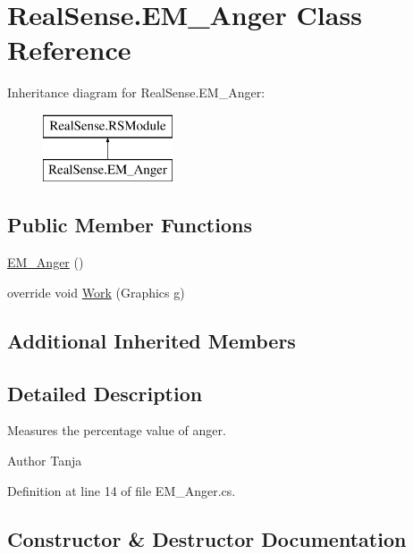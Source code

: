 \hypertarget{class_real_sense_1_1_e_m___anger}{}\section{Real\+Sense.\+E\+M\+\_\+\+Anger Class Reference}
\label{class_real_sense_1_1_e_m___anger}
Inheritance diagram for Real\+Sense.\+E\+M\+\_\+\+Anger\+:\begin{figure}[H]
\begin{center}
\leavevmode
\includegraphics[height=2.000000cm]{class_real_sense_1_1_e_m___anger}
\end{center}
\end{figure}
\subsection*{Public Member Functions}
\begin{DoxyCompactItemize}
\item 
\hyperlink{class_real_sense_1_1_e_m___anger_a843c377f0f47a7e016968dbccdcbc819}{E\+M\+\_\+\+Anger} ()
\item 
override void \hyperlink{class_real_sense_1_1_e_m___anger_a5c1f3b6b7e84ee926869828a3cfe532a}{Work} (Graphics g)
\end{DoxyCompactItemize}
\subsection*{Additional Inherited Members}


\subsection{Detailed Description}
Measures the percentage value of anger. \begin{DoxyAuthor}{Author}
Tanja 
\end{DoxyAuthor}


Definition at line 14 of file E\+M\+\_\+\+Anger.\+cs.



\subsection{Constructor \& Destructor Documentation}
\mbox{\label{class_real_sense_1_1_e_m___anger_a843c377f0f47a7e016968dbccdcbc819}} 
